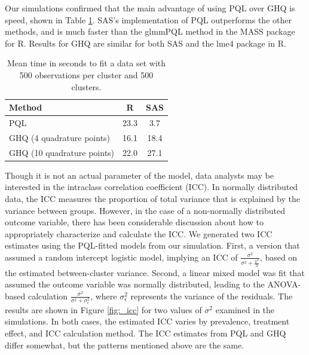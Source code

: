 \documentclass[Afour,times,sagev,doublespace]{sagej}
\begin{document}
Our simulations confirmed that the main advantage of using PQL over GHQ is speed, shown in Table \ref{tab:method_speed}. SAS's implementation of PQL outperforms the other methods, and is much faster than the glmmPQL method in the MASS package for R. Results for GHQ are similar for both SAS and the lme4 package in R.


\begin{table}[h]
\centering
 \begin{tabular}{l | c c} 
 Method & R & SAS \\ 
 \hline
 PQL & 23.3 & 3.7 \\ 
 GHQ (4 quadrature points) & 16.1 &  18.4 \\
 GHQ (10 quadrature points) & 22.0 &  27.1 \\ 
 \end{tabular}
    \caption{Mean time in seconds to fit a data set with 500 observations per cluster and 500 clusters.}
    \label{tab:method_speed}
\end{table}

Though it is not an actual parameter of the model, data analysts may be interested in the intraclass correlation coefficient (ICC). In normally distributed data, the ICC measures the proportion of total variance that is explained by the variance between groups. However, in the case of a non-normally distributed outcome variable, there has been considerable discussion about how to appropriately characterize and calculate the ICC\cite{wu_comparison_2012}\cite{nakagawa_shinichi_coefficient_2017}. We generated two ICC estimates using the PQL-fitted models from our simulation.  First, a version that assumed a random intercept logistic model, implying an ICC of $\frac{\sigma^2}{\sigma^2+\frac{\pi^2}{3}}$, based on the estimated between-cluster variance\cite{wu_comparison_2012}. Second, a linear mixed model was fit that assumed the outcome variable was normally distributed, leading to the ANOVA-based calculation $\frac{\sigma^2}{\sigma^2+\sigma^2_{\epsilon}}$, where $\sigma^2_{\epsilon}$ represents the variance of the residuals\cite{wu_comparison_2012}. The results are shown in Figure \ref{fig:_icc} for two values of $\sigma^2$ examined in the simulations. In both cases, the estimated ICC varies by prevalence, treatment effect, and ICC calculation method. The ICC estimates from PQL and GHQ differ somewhat, but the patterns mentioned above are the same.
\end{document}
